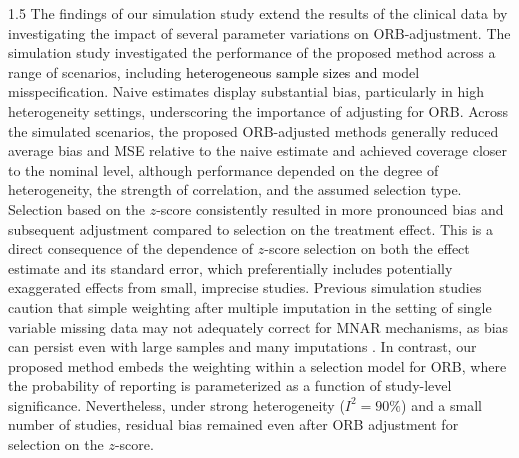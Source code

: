 \documentclass{article}
\newcommand{\mycolor}[1]{\textcolor{black}{#1}}
\begin{document}
\begin{spacing}{1.5}
The findings of our simulation study extend the results of the clinical data by investigating the impact of several parameter variations on ORB-adjustment. The simulation study investigated the performance of the proposed method across a range of scenarios, including \mycolor{heterogeneous sample sizes and} model misspecification. Naive estimates display substantial bias, particularly in high heterogeneity settings, underscoring the importance of adjusting for ORB. Across the simulated scenarios, the proposed ORB-adjusted methods generally reduced average bias and MSE relative to the naive estimate and achieved coverage closer to the nominal level, although performance depended on the degree of heterogeneity, the strength of correlation, and the assumed selection type. Selection based on the $z$-score  consistently resulted in more pronounced bias and subsequent adjustment compared to selection on the treatment effect. This is a direct consequence of the dependence of $z$-score selection on both the effect estimate and its standard error, which preferentially includes potentially exaggerated effects from small, imprecise studies. Previous simulation studies caution that simple weighting after multiple imputation in the setting of single variable missing data may not adequately correct for MNAR mechanisms, as bias can persist even with large samples and many imputations \cite{hayati2015evaluation, carpenter2007sensitivity}. In contrast, our proposed method embeds the weighting within a selection model for ORB, where the probability of reporting is parameterized as a function of study-level significance. Nevertheless, under strong heterogeneity ($I^2=90\%$) and a small number of studies, residual bias remained even after ORB adjustment for selection on the $z$-score.


\end{spacing}
\end{document}
